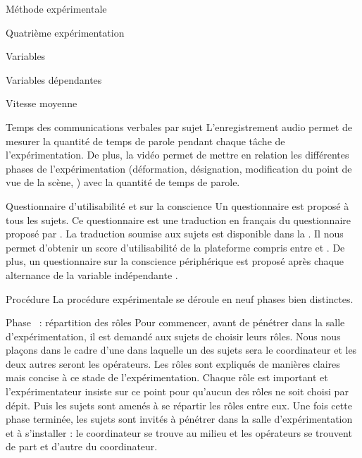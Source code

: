 \documentclass[myfrancais,ngerman,english,french]{mythesis}
\begin{document}
\begin{mychapter}{Méthode expérimentale}
\begin{mysection}{Quatrième expérimentation}
\begin{mysubsection}{Variables}
\begin{mysubsubsection}{Variables dépendantes}
\begin{myparagraph}{ Vitesse moyenne}
					\end{myparagraph}
					\begin{myparagraph}{ Temps des communications verbales par sujet}
						L'enregistrement audio permet de mesurer la quantité de temps de parole pendant chaque tâche de l'expérimentation.
						De plus, la vidéo permet de mettre en relation les différentes phases de l'expérimentation (déformation, désignation, modification du point de vue de la scène, \myetc) avec la quantité de temps de parole.
					\end{myparagraph}
					\begin{myparagraph}{ Questionnaire d'utilisabilité et sur la conscience}
						Un questionnaire est proposé à tous les sujets.
						Ce questionnaire est une traduction en français du questionnaire  proposé par .
						La traduction soumise aux sujets est disponible dans la .
						Il nous permet d'obtenir un score d'utilisabilité de la plateforme compris entre  et .
						De plus, un questionnaire sur la conscience périphérique est proposé après chaque alternance de la variable indépendante .
					\end{myparagraph}
				\end{mysubsubsection}
			\end{mysubsection}
			\begin{mysubsection}{Procédure}
				La procédure expérimentale se déroule en neuf phases bien distinctes.
				\begin{myparagraph}{Phase~ : répartition des rôles}
					Pour commencer, avant de pénétrer dans la salle d'expérimentation, il est demandé aux sujets de choisir leurs rôles.
					Nous nous plaçons dans le cadre d'une  dans laquelle un des sujets sera le coordinateur et les deux autres seront les opérateurs.
					Les rôles sont expliqués de manières claires mais concise à ce stade de l'expérimentation.
					Chaque rôle est important et l'expérimentateur insiste sur ce point pour qu'aucun des rôles ne soit choisi par dépit.
					Puis les sujets sont amenés à se répartir les rôles entre eux.
					Une fois cette phase terminée, les sujets sont invités à pénétrer dans la salle d'expérimentation et à s'installer : le coordinateur se trouve au milieu et les opérateurs se trouvent de part et d'autre du coordinateur.

\end{myparagraph}
\end{mysubsection}
\end{mysection}
\end{mychapter}
\end{document}
